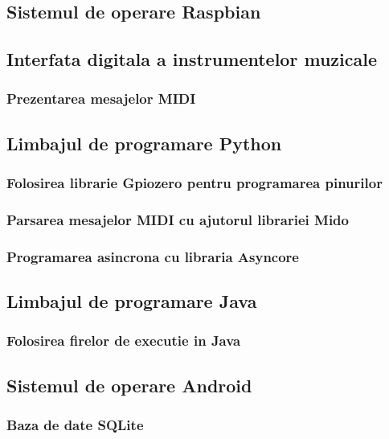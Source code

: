 \documentclass[../IoMusT.tex]{subfiles}
\begin{document}
\subsection{Sistemul de operare Raspbian}
\subsection{Interfata digitala a instrumentelor muzicale}
\subsubsection{Prezentarea mesajelor MIDI}
\subsection{Limbajul de programare Python}
\subsubsection{Folosirea librarie Gpiozero pentru programarea pinurilor}
\subsubsection{Parsarea mesajelor MIDI cu ajutorul librariei Mido}
\subsubsection{Programarea asincrona cu libraria Asyncore}
\subsection{Limbajul de programare Java}
\subsubsection{Folosirea firelor de executie in Java}
\subsection{Sistemul de operare Android}
\subsubsection{Baza de date SQLite}
\end{document}
